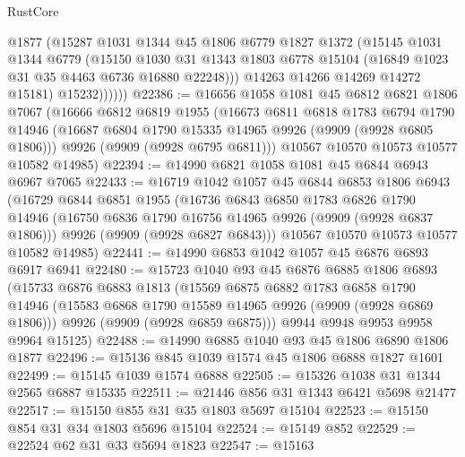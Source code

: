 \begin{lexlean}{RustCore}
\begin{coremodule}
                @1877
                (@15287
                  @1031
                  @1344
                  @45
                  @1806
                  @6779
                  @1827
                  @1372
                  (@15145
                    @1031
                    @1344
                    @6779
                    (@15150
                      @1030
                      @31
                      @1343
                      @1803
                      @6778
                      @15104
                      (@16849 @1023 @31 @35 @4463 @6736 @16880 @22248)))
                  @14263
                  @14266
                  @14269
                  @14272
                  @15181)
                @15232))))))
@22386 := @16656
    @1058
    @1081
    @45
    @6812
    @6821
    @1806
    @7067
    (@16666
      @6812
      @6819
      @1955
      (@16673
        @6811
        @6818
        @1783
        @6794
        @1790
        @14946
        (@16687 @6804 @1790 @15335 @14965 @9926 (@9909 (@9928 @6805 @1806)))
        @9926
        (@9909 (@9928 @6795 @6811)))
      @10567
      @10570
      @10573
      @10577
      @10582
      @14985)
@22394 := @14990 @6821 @1058 @1081 @45 @6844 @6943 @6967 @7065
@22433 := @16719
    @1042
    @1057
    @45
    @6844
    @6853
    @1806
    @6943
    (@16729
      @6844
      @6851
      @1955
      (@16736
        @6843
        @6850
        @1783
        @6826
        @1790
        @14946
        (@16750 @6836 @1790 @16756 @14965 @9926 (@9909 (@9928 @6837 @1806)))
        @9926
        (@9909 (@9928 @6827 @6843)))
      @10567
      @10570
      @10573
      @10577
      @10582
      @14985)
@22441 := @14990 @6853 @1042 @1057 @45 @6876 @6893 @6917 @6941
@22480 := @15723
    @1040
    @93
    @45
    @6876
    @6885
    @1806
    @6893
    (@15733
      @6876
      @6883
      @1813
      (@15569
        @6875
        @6882
        @1783
        @6858
        @1790
        @14946
        (@15583 @6868 @1790 @15589 @14965 @9926 (@9909 (@9928 @6869 @1806)))
        @9926
        (@9909 (@9928 @6859 @6875)))
      @9944
      @9948
      @9953
      @9958
      @9964
      @15125)
@22488 := @14990 @6885 @1040 @93 @45 @1806 @6890 @1806 @1877
@22496 := @15136 @845 @1039 @1574 @45 @1806 @6888 @1827 @1601
@22499 := @15145 @1039 @1574 @6888
@22505 := @15326 @1038 @31 @1344 @2565 @6887 @15335
@22511 := @21446 @856 @31 @1343 @6421 @5698 @21477
@22517 := @15150 @855 @31 @35 @1803 @5697 @15104
@22523 := @15150 @854 @31 @34 @1803 @5696 @15104
@22524 := @15149 @852
@22529 := @22524 @62 @31 @33 @5694 @1823
@22547 := @15163

\end{coremodule}
\end{lexlean}
